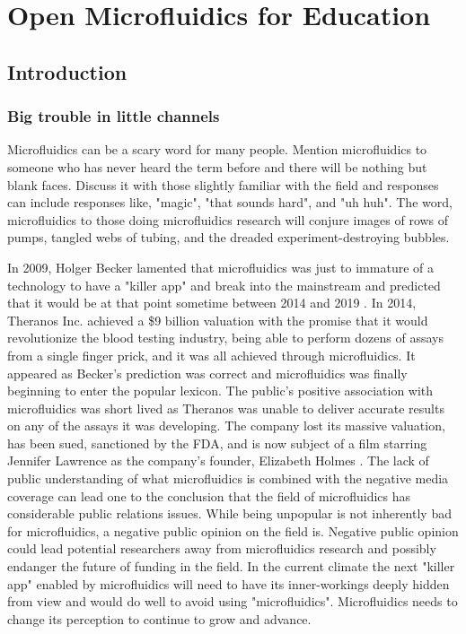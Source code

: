 \chapter{Open Microfluidics for Education}
\label{App:OpenMicrofluidics}

\section{Introduction}

\subsection{Big trouble in little channels}
Microfluidics can be a scary word for many people. Mention microfluidics to someone who has never heard the term before and there will be nothing but blank faces. Discuss it with those slightly familiar with the field and responses can include responses like, "magic", "that sounds hard", and "uh huh". The word, microfluidics to those doing microfluidics research will conjure images of rows of pumps, tangled webs of tubing, and the dreaded experiment-destroying bubbles.

In 2009, Holger Becker lamented that microfluidics was just to immature of a technology to have a "killer app" and break into the mainstream and predicted that it would be at that point sometime between 2014 and 2019 \cite{Becker2009HypeMicrofluidics}. In 2014, Theranos Inc. achieved a \$9 billion valuation with the promise that it would revolutionize the blood testing industry, being able to perform dozens of assays from a single finger prick, and it was all achieved through microfluidics. It appeared as Becker's prediction was correct and microfluidics was finally beginning to enter the popular lexicon. The public's positive association with microfluidics was short lived as Theranos was unable to deliver accurate results on any of the assays it was developing. The company lost its massive valuation, has been sued, sanctioned by the FDA, and is now subject of a film starring Jennifer Lawrence as the company's founder, Elizabeth Holmes \cite{Stockton2016}. The lack of public understanding of what microfluidics is combined with the negative media coverage can lead one to the conclusion that the field of microfluidics has considerable public relations issues. While being unpopular is not inherently bad for microfluidics, a negative public opinion on the field is. Negative public opinion could lead potential researchers away from microfluidics research and possibly endanger the future of funding in the field. In the current climate the next "killer app" enabled by microfluidics will need to have its inner-workings deeply hidden from view and would do well to avoid using "microfluidics". Microfluidics needs to change its perception to continue to grow and advance.

